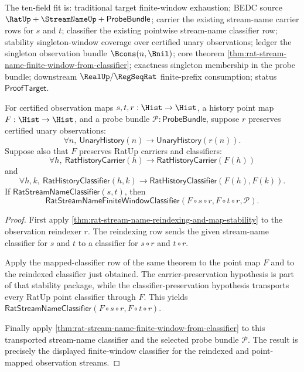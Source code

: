 The ten-field fit is: traditional target finite-window exhaustion; BEDC source
$\RatUp+\StreamNameUp+\mathsf{ProbeBundle}$; carrier the existing stream-name
carrier rows for $s$ and $t$; classifier the existing pointwise stream-name
classifier row; stability singleton-window coverage over certified unary
observations; ledger the singleton observation bundle $\Bcons(n,\Bnil)$;
core theorem \autoref{thm:rat-stream-name-finite-window-from-classifier};
exactness singleton membership in the probe bundle; downstream
$\RealUp/\RegSeqRat$ finite-prefix consumption; status
$\mathsf{ProofTarget}$.

\begin{theorem}
\label{thm:rat-stream-name-finite-window-reindexed-map-coverage}
For certified observation maps $s,t,r:\Hist\to\Hist$, a history point map
$F:\Hist\to\Hist$, and a probe bundle
$\mathcal{P}:\mathsf{ProbeBundle}$, suppose $r$ preserves certified unary
observations:
$$
\forall n,\ \mathsf{UnaryHistory}(n)\to\mathsf{UnaryHistory}(r(n)).
$$
Suppose also that $F$ preserves RatUp carriers and classifiers:
$$
\forall h,\ \mathsf{RatHistoryCarrier}(h)\to
\mathsf{RatHistoryCarrier}(F(h))
$$
and
$$
\forall h,k,\ \mathsf{RatHistoryClassifier}(h,k)\to
\mathsf{RatHistoryClassifier}(F(h),F(k)).
$$
If $\mathsf{RatStreamNameClassifier}(s,t)$, then
$$
\mathsf{RatStreamNameFiniteWindowClassifier}
(F\circ s\circ r,F\circ t\circ r,\mathcal{P}).
$$
\end{theorem}
\begin{proof}
First apply
\autoref{thm:rat-stream-name-reindexing-and-map-stability} to the observation
reindexer $r$. The reindexing row sends the given stream-name classifier for
$s$ and $t$ to a classifier for $s\circ r$ and $t\circ r$.

Apply the mapped-classifier row of the same theorem to the point map $F$ and
to the reindexed classifier just obtained. The carrier-preservation hypothesis
is part of that stability package, while the classifier-preservation hypothesis
transports every RatUp point classifier through $F$. This yields
$\mathsf{RatStreamNameClassifier}(F\circ s\circ r,F\circ t\circ r)$.

Finally apply
\autoref{thm:rat-stream-name-finite-window-from-classifier} to this transported
stream-name classifier and the selected probe bundle $\mathcal{P}$. The result
is precisely the displayed finite-window classifier for the reindexed and
point-mapped observation streams.
\end{proof}

